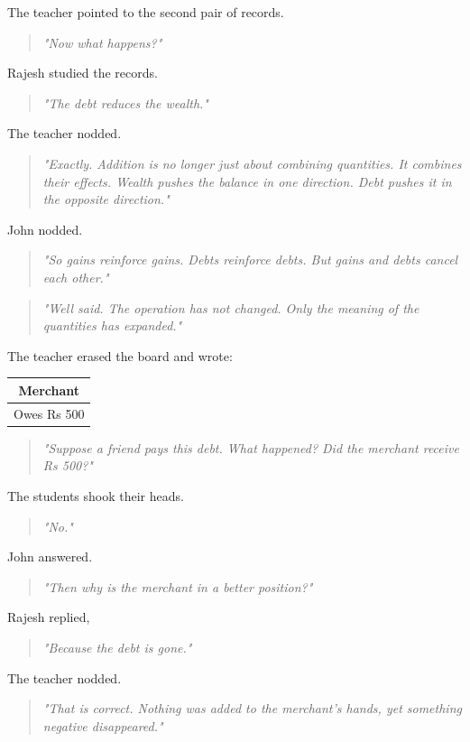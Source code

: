 \documentclass[11pt]{article}
\begin{document}
The teacher pointed to the second pair of records.
\begin{quote}
\emph{"Now what happens?"}
\end{quote}
Rajesh studied the records.
\begin{quote}
\emph{"The debt reduces the wealth."}
\end{quote}
The teacher nodded.
\begin{quote}
\emph{"Exactly. Addition is no longer just about combining quantities. It combines their effects. Wealth pushes the balance in one direction. Debt pushes it in the opposite direction."}
\end{quote}
John nodded.
\begin{quote}
\emph{"So gains reinforce gains. Debts reinforce debts. But gains and debts cancel each other."}
\end{quote}
\begin{quote}
\emph{"Well said. The operation has not changed. Only the meaning of the quantities has expanded."}
\end{quote}
The teacher erased the board and wrote:

\begin{center}
\begin{tabular}{|c|}
\hline
Merchant\\
\hline
Owes Rs 500\\
\hline
\end{tabular}
\end{center}

\begin{quote}
\emph{"Suppose a friend pays this debt. What happened? Did the merchant receive Rs 500?"}
\end{quote}

The students shook their heads.

\begin{quote}
\emph{"No."}
\end{quote}

John answered.

\begin{quote}
\emph{"Then why is the merchant in a better position?"}
\end{quote}

Rajesh replied,

\begin{quote}
\emph{"Because the debt is gone."}
\end{quote}

The teacher nodded.

\begin{quote}
\emph{"That is correct. Nothing was added to the merchant's hands, yet something negative disappeared."}
\end{quote}
\end{document}

